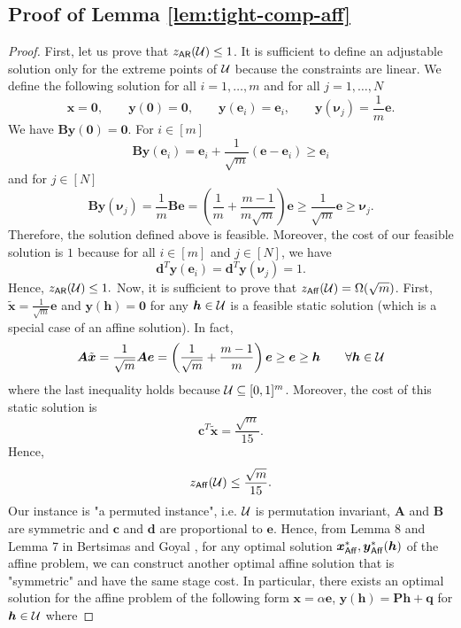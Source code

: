\documentclass[11pt]{article}
\theoremstyle{plain}
\theoremstyle{definition}
\numberwithin{equation}{section}%
\numberwithin{equation}{section}%
\newcommand{\mb}[1]{\ensuremath{\boldsymbol{#1}}}
\begin{document}
\begin{appendix}
{\section{Proof of Lemma \ref{lem:tight-comp-aff}}\label{apx-proofs:lem:tight-comp-aff}
\begin{proof}
First, let us prove that $z_{\sf AR}({\cal U}) \leq 1$. It is sufficient to define an adjustable solution only for the extreme points of ${\cal U}$ because the constraints are linear. We define the following solution for all $i=1,\ldots,m$ and for all $j=1,\ldots,N$
$$  \mb x = \mb 0 , \qquad \mb y ( \mb 0) = \mb 0, \qquad  \mb y ( \mb e_i) = \mb e_i, \qquad  \mb y ( \mb \nu_j) = \frac{1}{m} \mb e.$$
We have $\mb B \mb y ( \mb 0) = \mb 0$. For $i \in [m]$
$$\mb B \mb y ( \mb e_i) = \mb e_i + \frac{1}{\sqrt{m}} ( \mb e - \mb e_i) \geq  \mb e_i$$
and for $j \in [N]$
$$\mb B \mb y (\mb \nu_j) = \frac{1}{m} \mb B \mb e = \left( \frac{1}{m}+ \frac{m-1}{m \sqrt{m}} \right) \mb e \geq \frac{1}{\sqrt{m}} \mb e    \geq \mb \nu_j.$$
Therefore, the solution defined above is feasible. Moreover, the cost of our feasible solution is $1$ because for all $i \in [m]$ and $j \in [N]$,   we have
$$ \mb d^T \mb y ( \mb e_i)= \mb d^T \mb y ( \mb \nu_j)= 1.$$
Hence, $z_{\sf AR}({\cal U}) \leq 1.$
Now, it is sufficient to prove that  $z_{\sf Aff}({\cal U})= \Omega ( \sqrt{m})$. First, $\tilde{\mb x}= \frac{1}{\sqrt{m}} \mb e $ and $\mb y( \mb h)= \mb 0$ for any $\mb h \in {\cal U}$ is a feasible static solution (which is a special case of an affine solution).  In fact, $$\mb A \tilde{\mb x}= \frac{1}{\sqrt{m}} \mb A \mb e = \left( \frac{1}{\sqrt{m}}+ \frac{m-1}{m} \right) \mb e \geq \mb e \geq \mb h      \qquad \forall \mb h \in {\cal U}$$
where the last inequality holds because $ {\cal U} \subseteq [0,1]^m$. Moreover, the cost of this static solution is
$$ \mb c^T \tilde{\mb x} = \frac{\sqrt{m}}{15}.$$
Hence,
\begin{equation} \label{contradic}
z_{\sf Aff}({\cal U}) \leq  \frac{\sqrt{m}}{15}.
\end{equation}
Our instance is "a permuted instance", i.e. ${\cal U}$ is  permutation invariant, $\mb A$ and $\mb B$ are symmetric and $\mb c$ and $\mb d$ are proportional to $\mb e$. Hence,
from Lemma 8 and Lemma 7 in Bertsimas and Goyal \cite{BG10},  for any optimal solution $\mb x^*_{\sf Aff}, \mb y^*_{\sf Aff}( \mb h)$ of the affine problem, we can construct another optimal affine solution that is "symmetric" and have the same  stage cost. In particular, there exists an optimal solution for the affine problem  of the following form $ \mb x= \alpha \mb e$, $ \mb y( \mb h) = \mb P \mb h + \mb q$ for $\mb h \in {\cal U}$ where

\end{proof}}
\end{appendix}
\end{document}
